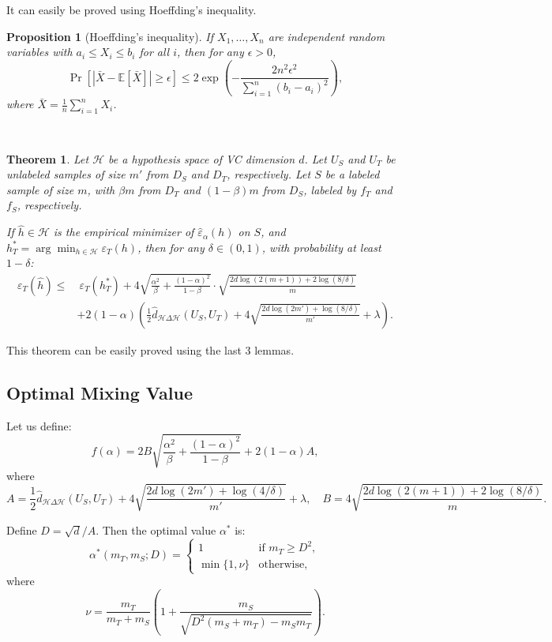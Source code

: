 \documentclass{article}
\newtheorem{proposition}{Proposition}
\newtheorem{theorem}{Theorem}
\begin{document}
It can easily be proved using Hoeffding’s inequality.

\begin{proposition}[Hoeffding’s inequality]
If $X_1, \ldots, X_n$ are independent random variables with $a_i \leq X_i \leq b_i$ for all $i$, then for any $\epsilon > 0$,
\[
\Pr\left[|\bar{X} - \mathbb{E}[\bar{X}]| \geq \epsilon\right] \leq 2 \exp\left(-\frac{2n^2\epsilon^2}{\sum_{i=1}^n (b_i - a_i)^2} \right),
\]
where $\bar{X} = \frac{1}{n} \sum_{i=1}^n X_i$.
\end{proposition}
\\

\begin{theorem}
Let $\mathcal{H}$ be a hypothesis space of VC dimension $d$. Let $U_S$ and $U_T$ be unlabeled samples of size $m'$ from $D_S$ and $D_T$, respectively. Let $S$ be a labeled sample of size $m$, with $\beta m$ from $D_T$ and $(1 - \beta)m$ from $D_S$, labeled by $f_T$ and $f_S$, respectively.

If $\hat{h} \in \mathcal{H}$ is the empirical minimizer of $\hat{\varepsilon}_\alpha(h)$ on $S$, and $h_T^* = \arg\min_{h \in \mathcal{H}} \varepsilon_T(h)$, then for any $\delta \in (0, 1)$, with probability at least $1 - \delta$:
\begin{align*}
\varepsilon_T(\hat{h}) \leq & \ \varepsilon_T(h_T^*) + 4 \sqrt{\frac{\alpha^2}{\beta} + \frac{(1 - \alpha)^2}{1 - \beta}} \cdot \sqrt{\frac{2d \log(2(m + 1)) + 2 \log(8 / \delta)}{m}} \\
& + 2(1 - \alpha) \left( \frac{1}{2} \hat{d}_{\mathcal{H} \Delta \mathcal{H}}(U_S, U_T) + 4 \sqrt{\frac{2d \log(2m') + \log(8 / \delta)}{m'}} + \lambda \right).
\end{align*}
\end{theorem}

This theorem can be easily proved using the last 3 lemmas.

\subsection*{Optimal Mixing Value}

Let us define:
\[
f(\alpha) = 2B \sqrt{\frac{\alpha^2}{\beta} + \frac{(1 - \alpha)^2}{1 - \beta}} + 2(1 - \alpha)A,
\]
where
\[
A = \frac{1}{2} \hat{d}_{\mathcal{H} \Delta \mathcal{H}}(U_S, U_T) + 4 \sqrt{\frac{2d \log(2m') + \log(4/\delta)}{m'}} + \lambda,
\quad
B = 4 \sqrt{\frac{2d \log(2(m + 1)) + 2 \log(8/\delta)}{m}}.
\]

Define $D = \sqrt{d}/A$. Then the optimal value $\alpha^*$ is:
\[
\alpha^*(m_T, m_S; D) = 
\begin{cases}
1 & \text{if } m_T \geq D^2, \\
\min\{1, \nu\} & \text{otherwise},
\end{cases}
\]
where
\[
\nu = \frac{m_T}{m_T + m_S} \left(1 + \frac{m_S}{\sqrt{D^2(m_S + m_T) - m_S m_T}}\right).
\]
\end{document}

